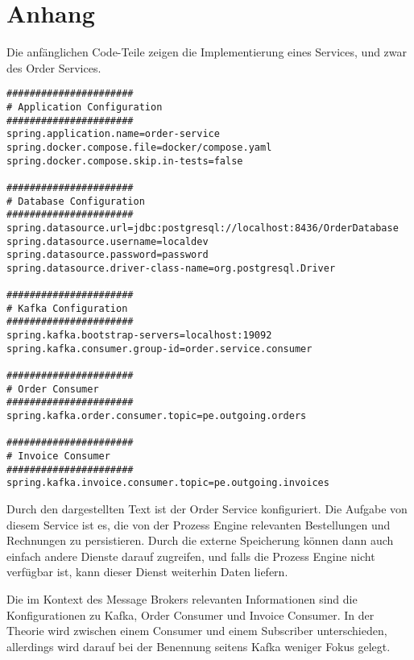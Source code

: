 {}
\section*{Anhang}

Die anfänglichen Code-Teile zeigen die Implementierung eines Services, und zwar des Order Services.

\begin{lstlisting}[language=SH, caption=Order Persistence Service - Configuration]
######################
# Application Configuration
######################
spring.application.name=order-service
spring.docker.compose.file=docker/compose.yaml
spring.docker.compose.skip.in-tests=false

######################
# Database Configuration
######################
spring.datasource.url=jdbc:postgresql://localhost:8436/OrderDatabase
spring.datasource.username=localdev
spring.datasource.password=password
spring.datasource.driver-class-name=org.postgresql.Driver

######################
# Kafka Configuration
######################
spring.kafka.bootstrap-servers=localhost:19092
spring.kafka.consumer.group-id=order.service.consumer

######################
# Order Consumer
######################
spring.kafka.order.consumer.topic=pe.outgoing.orders

######################
# Invoice Consumer
######################
spring.kafka.invoice.consumer.topic=pe.outgoing.invoices
\end{lstlisting}

Durch den dargestellten Text ist der Order Service konfiguriert. Die Aufgabe von diesem Service ist es, die von der Prozess Engine relevanten Bestellungen und Rechnungen zu persistieren. Durch die externe Speicherung können dann auch einfach andere Dienste darauf zugreifen, und falls die Prozess Engine nicht verfügbar ist, kann dieser Dienst weiterhin Daten liefern.

Die im Kontext des Message Brokers relevanten Informationen sind die Konfigurationen zu Kafka, Order Consumer und Invoice Consumer. In der Theorie wird zwischen einem Consumer und einem Subscriber unterschieden, allerdings wird darauf bei der Benennung seitens Kafka weniger Fokus gelegt. \

